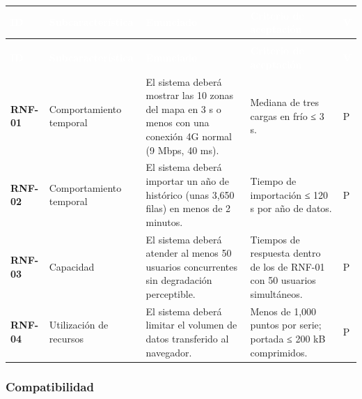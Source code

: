 \documentclass[11pt,a4paper,oneside]{article}
\begin{document}
{\footnotesize
\begin{xltabular}{\textwidth}{@{}>{\sffamily\bfseries}p{1.45cm}>{\raggedright\arraybackslash}p{2.4cm}YY>{\raggedright\arraybackslash}p{0.45cm}@{}}
\textcolor{white}{\sffamily\bfseries\footnotesize ID} & \textcolor{white}{\sffamily\bfseries\footnotesize Subcaracterística} & \textcolor{white}{\sffamily\bfseries\footnotesize Enunciado} & \textcolor{white}{\sffamily\bfseries\footnotesize Criterio de aceptación} & \textcolor{white}{\sffamily\bfseries\footnotesize V}\\
\endfirsthead
{}\\
\textcolor{white}{\sffamily\bfseries\footnotesize ID} & \textcolor{white}{\sffamily\bfseries\footnotesize Subcaracterística} & \textcolor{white}{\sffamily\bfseries\footnotesize Enunciado} & \textcolor{white}{\sffamily\bfseries\footnotesize Criterio de aceptación} & \textcolor{white}{\sffamily\bfseries\footnotesize V}\\
\endhead
RNF-01 & Comportamiento temporal & El sistema deberá mostrar las 10 zonas del mapa en 3 s o menos con una conexión 4G normal (9 Mbps, 40 ms). & Mediana de tres cargas en frío ≤ 3 s. & P\\ \hline
{}RNF-02 & Comportamiento temporal & El sistema deberá importar un año de histórico (unas 3,650 filas) en menos de 2 minutos. & Tiempo de importación ≤ 120 s por año de datos. & P\\ \hline
RNF-03 & Capacidad & El sistema deberá atender al menos 50 usuarios concurrentes sin degradación perceptible. & Tiempos de respuesta dentro de los de RNF-01 con 50 usuarios simultáneos. & P\\ \hline
{}RNF-04 & Utilización de recursos & El sistema deberá limitar el volumen de datos transferido al navegador. & Menos de 1,000 puntos por serie; portada ≤ 200 kB comprimidos. & P\\ \hline
\end{xltabular}}
\vspace{0.6em}

\subsubsection{Compatibilidad}
\end{document}
